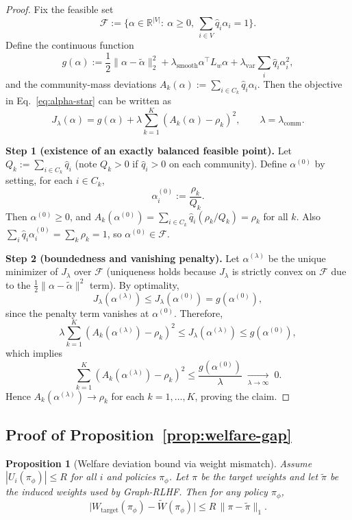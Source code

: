 \documentclass{article}
\newtheorem*{proposition*}{Proposition}
\theoremstyle{plain}
\theoremstyle{definition}
\theoremstyle{remark}
\begin{document}
\begin{proof}
Fix the feasible set
\[
\mathcal{F}:=\{\alpha\in\mathbb{R}^{|V|}:\ \alpha\ge 0,\ \sum_{i\in V}\hat q_i\alpha_i=1\}.
\]
Define the continuous function
\[
g(\alpha):=
\frac{1}{2}\|\alpha-\tilde\alpha\|_2^2
+\lambda_{\mathrm{smooth}}\alpha^\top L_w\alpha
+\lambda_{\mathrm{var}}\sum_i \hat q_i\alpha_i^2,
\]
and the community-mass deviations
$A_k(\alpha):=\sum_{i\in C_k}\hat q_i\alpha_i$.
Then the objective in Eq.~\eqref{eq:alpha-star} can be written as
\[
J_\lambda(\alpha)=g(\alpha)+\lambda\sum_{k=1}^K (A_k(\alpha)-\rho_k)^2,
\qquad \lambda=\lambda_{\mathrm{comm}}.
\]

\textbf{Step 1 (existence of an exactly balanced feasible point).}
Let $Q_k:=\sum_{i\in C_k}\hat q_i$ (note $Q_k>0$ if $\hat q_i>0$ on each community).
Define $\alpha^{(0)}$ by setting, for each $i\in C_k$,
\[
\alpha_i^{(0)}:=\frac{\rho_k}{Q_k}.
\]
Then $\alpha^{(0)}\ge 0$, and
$A_k(\alpha^{(0)})=\sum_{i\in C_k}\hat q_i(\rho_k/Q_k)=\rho_k$ for all $k$.
Also $\sum_i \hat q_i\alpha_i^{(0)}=\sum_k \rho_k=1$, so $\alpha^{(0)}\in\mathcal{F}$.

\textbf{Step 2 (boundedness and vanishing penalty).}
Let $\alpha^{(\lambda)}$ be the unique minimizer of $J_\lambda$ over $\mathcal{F}$
(uniqueness holds because $J_\lambda$ is strictly convex on $\mathcal{F}$ due to
the $\frac12\|\alpha-\tilde\alpha\|^2$ term).
By optimality,
\[
J_\lambda(\alpha^{(\lambda)}) \le J_\lambda(\alpha^{(0)}) = g(\alpha^{(0)}),
\]
since the penalty term vanishes at $\alpha^{(0)}$.
Therefore,
\[
\lambda\sum_{k=1}^K (A_k(\alpha^{(\lambda)})-\rho_k)^2
\le J_\lambda(\alpha^{(\lambda)}) \le g(\alpha^{(0)}),
\]
which implies
\[
\sum_{k=1}^K (A_k(\alpha^{(\lambda)})-\rho_k)^2 \le \frac{g(\alpha^{(0)})}{\lambda}
\;\xrightarrow[\lambda\to\infty]{}\; 0.
\]
Hence $A_k(\alpha^{(\lambda)})\to \rho_k$ for each $k=1,\dots,K$, proving the claim.
\end{proof}

\subsection{Proof of Proposition~\ref{prop:welfare-gap}}
\label{app:proof-welfare-gap}

\begin{proposition*}[Welfare deviation bound via weight mismatch]
Assume $|U_i(\pi_\phi)| \le R$ for all $i$ and policies $\pi_\phi$. Let
$\pi$ be the target weights and let $\tilde\pi$ be the induced weights
used by Graph-RLHF. Then for any policy $\pi_\phi$,
\begin{equation}
    \big|
        W_{\text{target}}(\pi_\phi)
        -
        \widetilde{W}(\pi_\phi)
    \big|
    \le
    R \, \|\pi - \tilde\pi\|_1.
\end{equation}
\end{proposition*}
\end{document}
